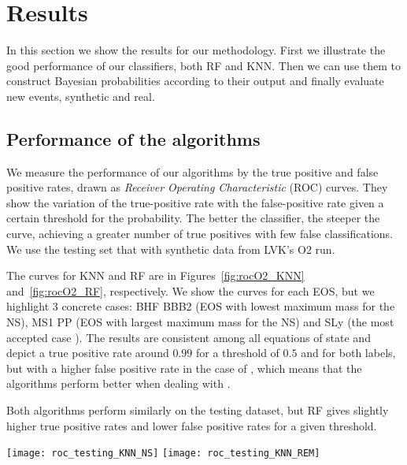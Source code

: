 \section{Results} \label{results}
In this section we show the results for our methodology. First we illustrate the good performance of our classifiers, both \ac{RF} and \ac{KNN}. Then we can use them to construct Bayesian probabilities according to their output and finally evaluate new events, synthetic and real.

\subsection{Performance of the algorithms}
We measure the performance of our algorithms by the true positive and false positive rates, drawn as \textit{Receiver Operating Characteristic} (ROC) curves. They show the variation of the true-positive rate  with the false-positive rate given a certain threshold for the probability. The better the classifier, the steeper the curve,  achieving a greater number of true positives with few false classifications. We use the testing set that with synthetic data from LVK's O2 run. 

The curves for \ac{KNN} and \ac{RF} are in Figures~\ref{fig:rocO2_KNN}
and~\ref{fig:rocO2_RF}, respectively. We show the curves for each EOS, but we
highlight 3 concrete cases: BHF BBB2 (EOS with lowest maximum mass for the NS),
MS1 PP (EOS with largest maximum mass for the NS) and SLy (the most accepted
case \mmt{[?]}). The results are consistent among all equations of state and
depict a true positive rate around $0.99$ for a threshold of $0.5$ and for both labels, but with a higher false positive rate in the case of \hasns, which means that the algorithms perform better when dealing with \hasrem.

Both algorithms perform similarly on the testing dataset, but \ac{RF} gives slightly higher true positive rates and lower false positive rates for a given threshold. 


\begin{figure*}%
\texttt{[image: roc\_testing\_KNN\_NS]}
\texttt{[image: roc\_testing\_KNN\_REM]}
\caption{ROC curves for the testing dataset for \ac{KNN}
    classifier. All 23 EoS shown in grey, in color the EoSs with minimum and
    maximum mass, along commonly used SLy.}
\label{fig:rocO2_KNN}
\end{figure*}

